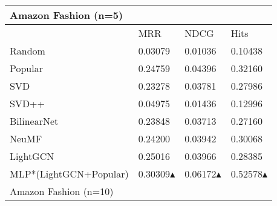 
\begin{tabular}{llll}
\hline
 Amazon Fashion (n=5)  &                                                        &                                                        &                                                        \\\hline
                       & MRR                                                    & NDCG                                                   & Hits                                                   \\\hline
 Random                & 0.03079                                                & 0.01036                                                & 0.10438                                                \\
 Popular               & 0.24759                                                & 0.04396                                                & 0.32160                                                \\
 SVD                   & 0.23278                                                & 0.03781                                                & 0.27986                                                \\
 SVD++                 & 0.04975                                                & 0.01436                                                & 0.12996                                                \\
 BilinearNet           & 0.23848                                                & 0.03713                                                & 0.27160                                                \\
 NeuMF                 & 0.24200                                                & 0.03942                                                & 0.30068                                                \\
 LightGCN              & 0.25016                                                & 0.03966                                                & 0.28385                                                \\
 MLP*(LightGCN+Popular) & 0.30309\textcolor[rgb]{00,0.45,0.10}{$\blacktriangle$} & 0.06172\textcolor[rgb]{00,0.45,0.10}{$\blacktriangle$} & 0.52578\textcolor[rgb]{00,0.45,0.10}{$\blacktriangle$} \\\hline
 Amazon Fashion (n=10) &                                                        &                                                        &                                                        \\\hline

\end{tabular}
